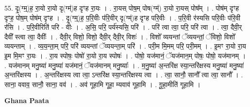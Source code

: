 \documentclass[17pt]{extarticle}
\begin{document}
55. दृ॒(ग्म्॒)ह॒ रा॒यो रा॒यो दृ(ग्म्॑)ह दृꣳह रा॒यः । . रा॒यस् पोष॒म् पोष(ग्म्॑) रा॒यो रा॒यस् पोष᳚म् । . पोष॑म् दृꣳह दृꣳह॒ पोष॒म् पोष॑म् दृꣳह । . दृ॒(ग्म्॒)ह॒ प॒रि॒वीः प॑रि॒वीर् दृ(ग्म्॑)ह दृꣳह परि॒वीः । . प॒रि॒वी र॑स्यसि परि॒वीः प॑रि॒वी र॑सि । . प॒रि॒वीरिति॑ परि - वीः । . अ॒सि॒ परि॒ पर्य॑स्यसि॒ परि॑ । . परि॑ त्वा त्वा॒ परि॒ परि॑ त्वा । . त्वा॒ दैवी॒र् दैवी᳚ स्त्वा त्वा॒ दैवीः᳚ । . दैवी॒र् विशो॒ विशो॒ दैवी॒र् दैवी॒र् विशः॑ । . विशो᳚ व्ययन्तां ॅव्ययन्तां॒ ॅविशो॒ विशो᳚ व्ययन्ताम् । . व्य॒य॒न्ता॒म् परि॒ परि॑ व्ययन्तां ॅव्ययन्ता॒म् परि॑ । . परी॒म मि॒मम् परि॒ परी॒मम् । . इ॒मꣳ रा॒यो रा॒य इ॒म मि॒मꣳ रा॒यः । . रा॒य स्पोषः॒ पोषो॑ रा॒यो रा॒य स्पोषः॑ । . पोषो॒ यज॑मानं॒ ॅयज॑मान॒म् पोषः॒ पोषो॒ यज॑मानम् । . यज॑मानम् मनु॒ष्या॑ मनु॒ष्या॑ यज॑मानं॒ ॅयज॑मानम् मनु॒ष्याः᳚ । . म॒नु॒ष्या॑ अ॒न्तरि॑क्ष स्या॒न्तरि॑क्षस्य मनु॒ष्या॑ मनु॒ष्या॑ अ॒न्तरि॑क्षस्य । . अ॒न्तरि॑क्षस्य त्वा त्वा॒ ऽन्तरि॑क्ष स्या॒न्तरि॑क्षस्य त्वा । . त्वा॒ सानौ॒ सानौ᳚ त्वा त्वा॒ सानौ᳚ । . साना॒ ववाव॒ सानौ॒ साना॒ वव॑ । . अव॑ गूहामि गूहा॒ म्यवाव॑ गूहामि । . गू॒हा॒मीति॑ गूहामि । \newline

\textbf{Ghana Paata } \newline
\end{document}
